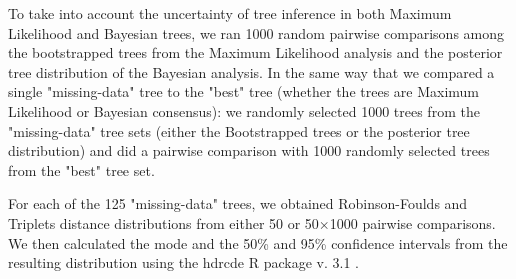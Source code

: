 \documentclass[12pt,letterpaper]{article}
\begin{document}
To take into account the uncertainty of tree inference in both Maximum Likelihood and Bayesian trees, we ran 1000 random pairwise comparisons among the bootstrapped trees from the Maximum Likelihood analysis and the posterior tree distribution of the Bayesian analysis. In the same way that we compared a single "missing-data" tree to the "best" tree (whether the trees are Maximum Likelihood or Bayesian consensus): we randomly selected 1000 trees from the "missing-data" tree sets (either the Bootstrapped trees or the posterior tree distribution) and did a pairwise comparison with 1000 randomly selected trees from the "best" tree set.

For each of the 125 "missing-data" trees, we obtained Robinson-Foulds and Triplets distance distributions from either 50 or 50$\times$1000 pairwise comparisons. We then calculated the mode and the 50\% and 95\% confidence intervals from the resulting distribution using the hdrcde R package v. 3.1 \citep{hdrcde}. %
\end{document}
